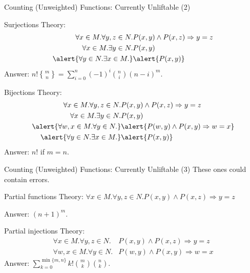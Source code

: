 \documentclass{beamer}
\DeclareRobustCommand{\stirling}{\genfrac\{\}{0pt}{}}
\begin{document}
\begin{frame}{Counting (Unweighted) Functions: Currently Unliftable (2)}
  \begin{block}{Surjections}
    Theory:
    \begin{align*}
      \forall x \in M. \forall y, z \in N. &P(x, y) \land P(x, z) \Rightarrow y=z \\
      \forall x \in M. \exists y \in N. &P(x, y) \\
      \alert{\forall y \in N. \exists x \in M.} &\alert{P(x, y)}
    \end{align*}
    Answer: $n!\stirling{m}{n} = \sum_{i=0}^n (-1)^i\binom{n}{i}(n-i)^m$.
  \end{block}
  \begin{block}{Bijections}
    Theory:
    \begin{align*}
      \forall x \in M. \forall y, z \in N. &P(x, y) \land P(x, z) \Rightarrow y=z \\
      \forall x \in M. \exists y \in N. &P(x, y) \\
      \alert{\forall w, x \in M. \forall y \in N.} &\alert{P(w, y) \land P(x, y) \Rightarrow w=x} \\
      \alert{\forall y \in N. \exists x \in M.} &\alert{P(x, y)}
    \end{align*}
    Answer: $n!$ if $m=n$.
  \end{block}
\end{frame}

\begin{frame}{Counting (Unweighted) Functions: Currently Unliftable (3)}
  These ones could contain errors.
  \begin{block}{Partial functions}
    Theory: $\forall x \in M. \forall y, z \in N. P(x, y) \land P(x, z)
    \Rightarrow y=z$

    Answer: $(n+1)^m$.
  \end{block}
  \begin{block}{Partial injections}
    Theory:
    \begin{align*}
      \forall x \in M. \forall y, z \in N. &P(x, y) \land P(x, z) \Rightarrow y=z \\
      \forall w, x \in M. \forall y \in N. &P(w, y) \land P(x, y) \Rightarrow w=x
    \end{align*}
    Answer: $\sum_{k=0}^{\min\{m, n\}} k!\binom{m}{k}\binom{n}{k}$.
  \end{block}
\end{frame}
\end{document}
